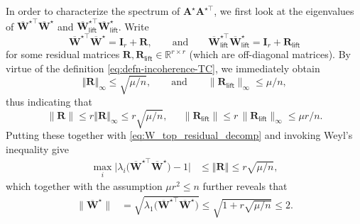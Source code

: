 In order to characterize the spectrum of $\bm{A}^{\star}\bm{A}^{\star\top}$, we  first look at the eigenvalues of $\overline{\bm{W}}^{\star\top} \overline{\bm{W}}^{\star}$ and $\overline{\bm{W}}^{\star\top}_{\mathsf{lift}} \overline{\bm{W}}^{\star}_{\mathsf{lift}}$. Write
%
\begin{equation}
	\overline{\bm{W}}^{\star\top} \overline{\bm{W}}^{\star}=\bm{I}_{r}+ \bm{R}, 
	\qquad\text{and}\qquad
	\overline{\bm{W}}^{\star\top}_{\mathsf{lift}}\overline{\bm{W}}^{\star}_{\mathsf{lift}}
	=\bm{I}_{r}+{\bm{R}}_{\mathsf{lift}}
	\label{eq:W_top_residual_decomp}
\end{equation}
%
for some residual matrices $\bm{R},{\bm{R}}_{\mathsf{lift}}\in\mathbb{R}^{r\times r}$ (which are off-diagonal matrices). By virtue of the definition \eqref{eq:defn-incoherence-TC}, we immediately obtain
%
\begin{equation*}
	\left\Vert \bm{R}\right\Vert _{\infty}\leq\sqrt{\mu /n},
	\qquad\text{and}\qquad
	\big\|{\bm{R}}_{\mathsf{lift}}\big\|_{\infty}\leq\mu /n,
\end{equation*}
%
thus indicating that
%
\begin{equation}
	\| \bm{R}\| \leq r\left\Vert \bm{R}\right\Vert _{\infty}\leq r\sqrt{\mu /n},
	\quad ~~
	\big\|{\bm{R}}_{\mathsf{lift}} \big\|\leq r \, \big\|{\bm{R}}_{\mathsf{lift}}\big\|_{\infty}\leq\mu r /  n .
	\label{eq:spectral-norm-residual_C_UB}
\end{equation}
%
Putting these together with \eqref{eq:W_top_residual_decomp} and invoking Weyl's inequality give
\begin{align}
\label{eq:spectraum-WWstar-bar-TC}
\max_{i}\Big|\lambda_{i}\big(\overline{\bm{W}}^{\star\top}\overline{\bm{W}}^{\star}\big)-1\Big| & \leq\left\Vert \bm{R}\right\Vert \leq r\sqrt{\mu /n},
\end{align}
%
which together with the assumption $\mu r^{2}\leq n$ further reveals that
%
\begin{align}
\label{eq:W_op_UB}
\big\|\overline{\bm{W}}^{\star}\big\| & =\sqrt{\lambda_{1}\big(\overline{\bm{W}}^{\star\top}\overline{\bm{W}}^{\star}\big)}\leq\sqrt{1+r\sqrt{\mu /n}} \leq 2.
\end{align}
%






